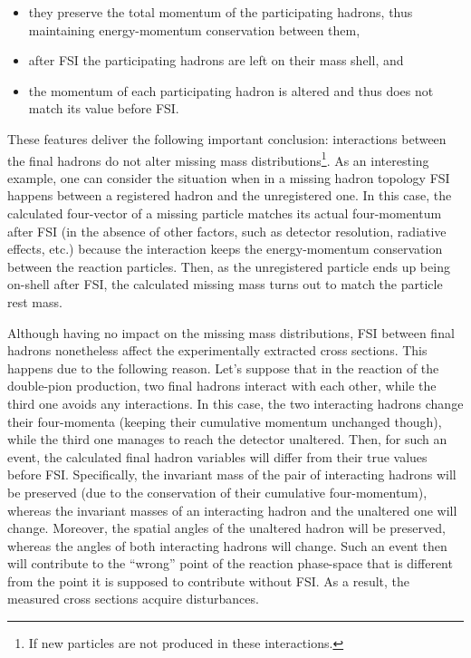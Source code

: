 \begin{itemize}
\item they preserve the total momentum of the participating hadrons, thus maintaining energy-momentum conservation between them,
\item after FSI the participating hadrons are left on their mass shell, and
\item the momentum of each participating hadron is altered and thus does not match its value before FSI.
\end{itemize}

These features deliver the following important conclusion: interactions between the final hadrons do not alter missing mass distributions\footnote[3]{If new particles are not produced in these interactions.}. As an interesting example, one can consider the situation when in a missing hadron topology FSI happens between a registered hadron and the unregistered one. In this case, the calculated four-vector of a missing particle matches its actual four-momentum after FSI (in the absence of other factors, such as detector resolution, radiative effects, etc.) because the interaction keeps the energy-momentum conservation between the reaction particles. Then, as the unregistered particle ends up being on-shell after FSI, the calculated missing mass turns out to match the particle rest mass.

Although having no impact on the missing mass distributions, FSI between final hadrons nonetheless affect the experimentally extracted cross sections. This happens due to the following reason. Let's suppose that in the reaction of the double-pion production, two final hadrons interact with each other, while the third one avoids any interactions. In this case, the two interacting hadrons change their four-momenta (keeping their cumulative momentum unchanged though), while the third one manages to reach the detector unaltered. Then, for such an event, the calculated final hadron variables will differ from their true values before FSI. Specifically, the invariant mass of the pair of interacting hadrons will be preserved (due to the conservation of their cumulative four-momentum), whereas the invariant masses of an interacting hadron and the unaltered one will change. Moreover, the spatial angles of the unaltered hadron will be preserved, whereas the angles of both interacting hadrons will change. Such an event then will contribute to the ``wrong'' point of the reaction phase-space that is different from the point it is supposed to contribute without FSI. As a result, the measured cross sections acquire disturbances.


